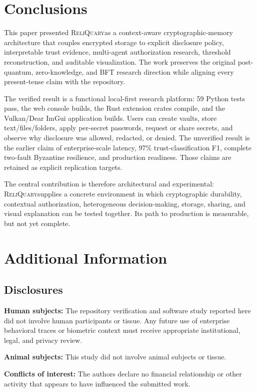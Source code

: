 \documentclass[10pt]{article}
\newcommand{\system}{\textsc{ReliQuary}}
\begin{document}
\section*{Conclusions}

This paper presented \system as a context-aware cryptographic-memory architecture that couples encrypted storage to explicit disclosure policy, interpretable trust evidence, multi-agent authorization research, threshold reconstruction, and auditable visualization. The work preserves the original post-quantum, zero-knowledge, and BFT research direction while aligning every present-tense claim with the repository.

The verified result is a functional local-first research platform: 59 Python tests pass, the web console builds, the Rust extension crates compile, and the Vulkan/Dear ImGui application builds. Users can create vaults, store text/files/folders, apply per-secret passwords, request or share secrets, and observe why disclosure was allowed, redacted, or denied. The unverified result is the earlier claim of enterprise-scale latency, 97\% trust-classification F1, complete two-fault Byzantine resilience, and production readiness. Those claims are retained as explicit replication targets.

The central contribution is therefore architectural and experimental: \system supplies a concrete environment in which cryptographic durability, contextual authorization, heterogeneous decision-making, storage, sharing, and visual explanation can be tested together. Its path to production is measurable, but not yet complete.

\section*{Additional Information}

\subsection*{Disclosures}

\textbf{Human subjects:} The repository verification and software study reported here did not involve human participants or tissue. Any future use of enterprise behavioral traces or biometric context must receive appropriate institutional, legal, and privacy review.

\textbf{Animal subjects:} This study did not involve animal subjects or tissue.

\textbf{Conflicts of interest:} The authors declare no financial relationship or other activity that appears to have influenced the submitted work.
\end{document}
